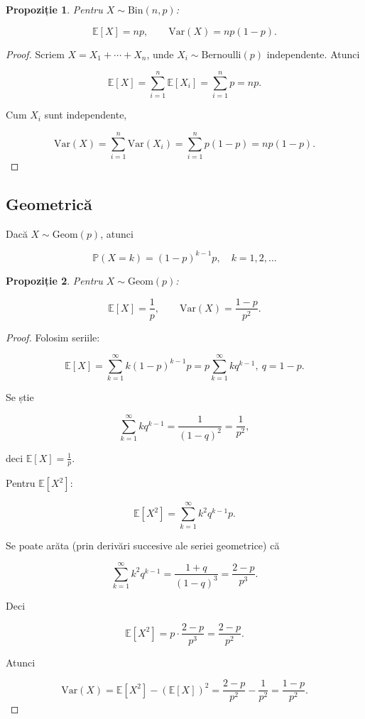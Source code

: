 \documentclass[12pt]{article}
\theoremstyle{plain}
\newtheorem{proposition}{Propoziție}
\begin{document}
\begin{proposition}
Pentru $X \sim \mathrm{Bin}(n,p)$:


\[
\mathbb{E}[X] = np,\qquad
\mathrm{Var}(X) = np(1-p).
\]


\end{proposition}

\begin{proof}
Scriem $X = X_1 + \cdots + X_n$, unde $X_i \sim \mathrm{Bernoulli}(p)$ independente.
Atunci


\[
\mathbb{E}[X] = \sum_{i=1}^n \mathbb{E}[X_i] = \sum_{i=1}^n p = np.
\]


Cum $X_i$ sunt independente,


\[
\mathrm{Var}(X) = \sum_{i=1}^n \mathrm{Var}(X_i) = \sum_{i=1}^n p(1-p) = np(1-p).
\]


\end{proof}

\subsection{Geometrică}

Dacă $X \sim \mathrm{Geom}(p)$, atunci


\[
\mathbb{P}(X=k) = (1-p)^{k-1}p,\quad k=1,2,\dots
\]



\begin{proposition}
Pentru $X \sim \mathrm{Geom}(p)$:


\[
\mathbb{E}[X] = \frac{1}{p},\qquad
\mathrm{Var}(X) = \frac{1-p}{p^2}.
\]


\end{proposition}

\begin{proof}
Folosim seriile:


\[
\mathbb{E}[X] = \sum_{k=1}^\infty k(1-p)^{k-1}p = p \sum_{k=1}^\infty k q^{k-1},\ q=1-p.
\]


Se știe


\[
\sum_{k=1}^\infty k q^{k-1} = \frac{1}{(1-q)^2} = \frac{1}{p^2},
\]


deci $\mathbb{E}[X]=\frac{1}{p}$.

Pentru $\mathbb{E}[X^2]$:


\[
\mathbb{E}[X^2] = \sum_{k=1}^\infty k^2 q^{k-1} p.
\]


Se poate arăta (prin derivări succesive ale seriei geometrice) că


\[
\sum_{k=1}^\infty k^2 q^{k-1} = \frac{1+q}{(1-q)^3} = \frac{2-p}{p^3}.
\]


Deci


\[
\mathbb{E}[X^2] = p \cdot \frac{2-p}{p^3} = \frac{2-p}{p^2}.
\]


Atunci


\[
\mathrm{Var}(X) = \mathbb{E}[X^2] - (\mathbb{E}[X])^2
= \frac{2-p}{p^2} - \frac{1}{p^2} = \frac{1-p}{p^2}.
\]


\end{proof}
\end{document}
